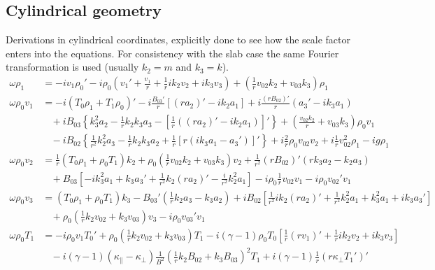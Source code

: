 \documentclass[11pt, fleqn]{article}
\begin{document}
\subsection{Cylindrical geometry}
Derivations in cylindrical coordinates, explicitly done to see how the scale factor enters into the equations. For consistency with the slab case the same Fourier transformation is used (usually $k_2 = m$ and $k_3 = k$).
\begin{equation}
	\begin{aligned}
		\omega \rho_1	  &= -iv_1\rho_0' - i\rho_0\left(v_1' + \frac{v_1}{r} + \frac{1}{r}ik_2v_2 + ik_3v_3\right) + \left(\frac{1}{r}v_{02}k_2 + v_{03}k_3\right)\rho_1																\\[8pt]
		\omega \rho_0 v_1 &= -i\left(T_0\rho_1 + T_1\rho_0\right)' - i\frac{B_{03}'}{r}\left[(ra_2)' - ik_2a_1\right] + i\frac{(rB_{02})'}{r}\left(a_3' - ik_3a_1\right)																\\
						  &~~~~ + iB_{03}\left\{k_3^2a_2 - \frac{1}{r}k_2k_3a_3 - \left[\frac{1}{r}\left((ra_2)' - ik_2a_1\right)\right]'\right\} + \left(\frac{v_{02}k_2}{r} + v_{03}k_3\right)\rho_0v_1								\\
						  &~~~~ - iB_{02}\left\{\frac{1}{r^2}k_2^2a_3 - \frac{1}{r}k_2k_3a_2 + \frac{1}{r}\left[r\left(ik_3a_1 - a_3'\right)\right]'\right\} + i\frac{2}{r}\rho_0v_{02}v_2 + i\frac{1}{r}v_{02}^2\rho_1 - ig\rho_1		\\[8pt]
		\omega \rho_0 v_2 &= \frac{1}{r}(T_0\rho_1 + \rho_0T_1)k_2 +\rho_0\left(\frac{1}{r}v_{02}k_2 + v_{03}k_3\right)v_2 + \frac{1}{r^2}(rB_{02})'(rk_3a_2 - k_2a_3)																	\\
						  &~~~~ + B_{03}\left[-ik_3^2a_1 + k_3a_3' + \frac{1}{r^2}k_2(ra_2)' - \frac{i}{r^2}k_2^2a_1\right] - i\rho_0\frac{1}{r}v_{02}v_1 - i\rho_0v_{02}'v_1															\\[8pt]
		\omega \rho_0 v_3 &= (T_0\rho_1 + \rho_0T_1)k_3 - B_{03}'\left(\frac{1}{r}k_2a_3 - k_3a_2\right) + iB_{02}\left[\frac{1}{r^2}ik_2(ra_2)' + \frac{1}{r^2}k_2^2a_1 + k_3^2a_1 + ik_3a_3'\right]									\\
					      &~~~~ + \rho_0\left(\frac{1}{r}k_2v_{02} + k_3v_{03}\right)v_3 - i\rho_0v_{03}'v_1																															\\[8pt]
		\omega \rho_0 T_1 &= -i\rho_0v_1T_0' +\rho_0\left(\frac{1}{r}k_2v_{02} + k_3v_{03}\right)T_1 - i(\gamma - 1)\rho_0T_0\left[\frac{1}{r}(rv_1)' + \frac{1}{r}ik_2v_2 + ik_3v_3\right]												\\
						  &~~~~ - i(\gamma - 1)(\kappa_\parallel - \kappa_\bot)\frac{1}{B^2}\left(\frac{1}{r}k_2B_{02} + k_3B_{03}\right)^2T_1 + i(\gamma - 1)\frac{1}{r}(r\kappa_\bot T_1')'											\\

\end{aligned}
\end{equation}
\end{document}
